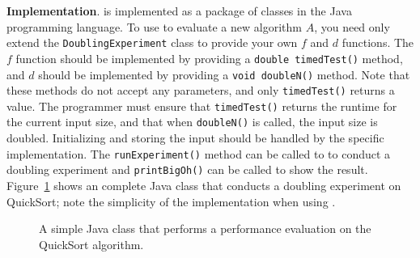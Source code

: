 
    {\bf Implementation}.  \toolname is implemented as a package of
    classes in the Java programming language.  To use \toolname to
    evaluate a new algorithm $A$, you need only extend the
    \texttt{DoublingExperiment} class to provide your own $f$ and $d$
    functions.  The $f$ function should be implemented by providing a
    \texttt{double timedTest()} method, and $d$ should be implemented by
    providing a \texttt{void doubleN()} method. Note that these methods
    do not accept any parameters, and only \texttt{timedTest()} returns
    a value. The programmer must ensure that \texttt{timedTest()}
    returns the runtime for the current input size, and that when
    \texttt{doubleN()} is called, the input size is doubled.
    Initializing and storing the input should be handled by the specific
    implementation. The \texttt{runExperiment()} method can be called to
    to conduct a doubling experiment and \texttt{printBigOh()} can be
    called to show the result. Figure~\ref{fig:qsprogram} shows an
    complete Java class that conducts a doubling experiment on
    QuickSort; note the simplicity of the implementation when using
    \toolname.



    \begin{figure}[t]
    
    \vspace{-0.15in}
    \caption{A simple Java class that performs a performance evaluation
    on the QuickSort algorithm.}\vspace{-0.20in}
    \label{fig:qsprogram}
    \end{figure}
